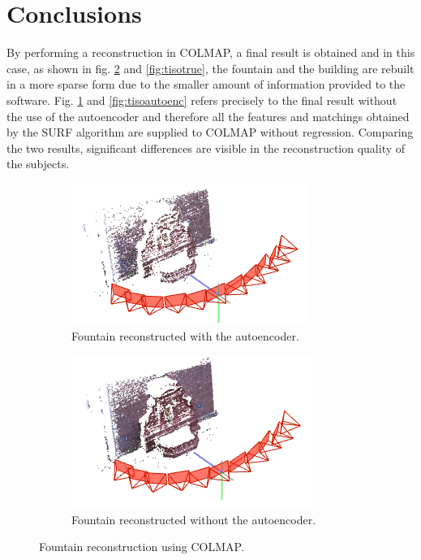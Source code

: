 

\section{Conclusions}
By performing a reconstruction in COLMAP, a final result is obtained and in this case, as shown in fig. \ref{fig:fountaintrue} and \ref{fig:tisotrue}, the fountain and the building are rebuilt in a more sparse form due to the smaller amount of information provided to the software. Fig. \ref{fig:fountainautoenc} and \ref{fig:tisoautoenc} refers precisely to the final result without the use of the autoencoder and therefore all the features and matchings obtained by the SURF algorithm are supplied to COLMAP without regression. Comparing the two results, significant differences are visible in the reconstruction quality of the subjects.


\begin{figure}[H]
     \centering
     \begin{subfigure}[b]{0.48\textwidth}
		\centering
		\includegraphics[width=\textwidth]{images/fountainautoenc.png}  
		\caption{\centering Fountain reconstructed with the autoencoder.}
	    	\label{fig:fountainautoenc} 
     \end{subfigure}
     \hfill
     \begin{subfigure}[b]{0.48\textwidth}
		\centering
    		\includegraphics[width=\textwidth]{images/fountaintrue.png}
		\caption{\centering Fountain reconstructed without the autoencoder.}
		\label{fig:fountaintrue}   
     \end{subfigure}
        \caption{Fountain reconstruction using COLMAP.}
        \label{fig:fountain3D}
\end{figure}


